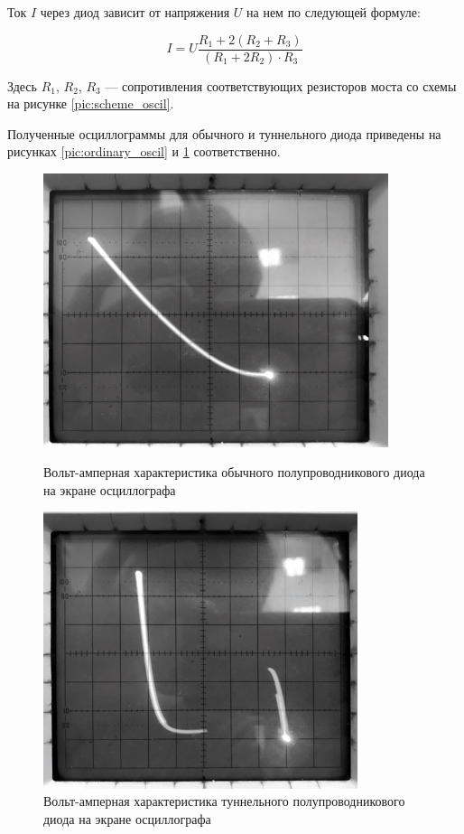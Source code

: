 \documentclass[12pt]{kiarticle} %
\begin{document}
	Ток $I$ через диод зависит от напряжения $U$ на нем по следующей формуле: 
	
	\[ I = U \frac{R_1 + 2(R_2 + R_3)}{(R_1 + 2R_2) \cdot R_3} \]
	
	Здесь $R_1$, $R_2$, $R_3$ --- сопротивления соответствующих резисторов моста со схемы на рисунке \ref{pic:scheme_oscil}. 
	
	Полученные осциллограммы для обычного и туннельного диода приведены на рисунках \ref{pic:ordinary_oscil} и \ref{pic:tunnel_oscil} соответственно. 
	
		\begin{figure}[h]
		\begin{minipage}[h]{0.49\linewidth}
		\centering	
		\includegraphics[width=0.9\textwidth]{o1.png}
		\caption{Вольт-амперная характеристика обычного полупроводникового диода на экране осциллографа}
		\label{pic:ordinary_oscil}
		\end{minipage}
		\begin{minipage}[h]{0.49\linewidth}
			\centering	
		\includegraphics[width=0.82\textwidth]{o2.png}
		\caption{Вольт-амперная характеристика туннельного полупроводникового диода на экране осциллографа}
		\label{pic:tunnel_oscil}
		\end{minipage}
	\end{figure}
	
\end{document}

